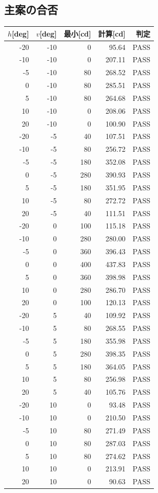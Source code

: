 \documentclass[11pt,a4paper]{article}
\newcommand{\pass}{\textcolor{green!45!black}{PASS}}
\begin{document}
\subsection{主案の合否}
\begin{longtable}{rrrrr}
\toprule
$h$[deg] & $v$[deg] & 最小[cd] & 計算[cd] & 判定 \\
\midrule
-20 & -10 & 0 & 95.64 & \pass{} \\
-10 & -10 & 0 & 207.11 & \pass{} \\
-5 & -10 & 80 & 268.52 & \pass{} \\
0 & -10 & 80 & 285.51 & \pass{} \\
5 & -10 & 80 & 264.68 & \pass{} \\
10 & -10 & 0 & 208.06 & \pass{} \\
20 & -10 & 0 & 100.90 & \pass{} \\
-20 & -5 & 40 & 107.51 & \pass{} \\
-10 & -5 & 80 & 256.72 & \pass{} \\
-5 & -5 & 180 & 352.08 & \pass{} \\
0 & -5 & 280 & 390.93 & \pass{} \\
5 & -5 & 180 & 351.95 & \pass{} \\
10 & -5 & 80 & 272.72 & \pass{} \\
20 & -5 & 40 & 111.51 & \pass{} \\
-20 & 0 & 100 & 115.18 & \pass{} \\
-10 & 0 & 280 & 280.00 & \pass{} \\
-5 & 0 & 360 & 396.43 & \pass{} \\
0 & 0 & 400 & 437.83 & \pass{} \\
5 & 0 & 360 & 398.98 & \pass{} \\
10 & 0 & 280 & 286.70 & \pass{} \\
20 & 0 & 100 & 120.13 & \pass{} \\
-20 & 5 & 40 & 109.92 & \pass{} \\
-10 & 5 & 80 & 268.55 & \pass{} \\
-5 & 5 & 180 & 355.98 & \pass{} \\
0 & 5 & 280 & 398.35 & \pass{} \\
5 & 5 & 180 & 364.05 & \pass{} \\
10 & 5 & 80 & 256.98 & \pass{} \\
20 & 5 & 40 & 105.76 & \pass{} \\
-20 & 10 & 0 & 93.48 & \pass{} \\
-10 & 10 & 0 & 210.50 & \pass{} \\
-5 & 10 & 80 & 271.49 & \pass{} \\
0 & 10 & 80 & 287.03 & \pass{} \\
5 & 10 & 80 & 274.62 & \pass{} \\
10 & 10 & 0 & 213.91 & \pass{} \\
20 & 10 & 0 & 90.63 & \pass{} \\
\bottomrule
\end{longtable}
\end{document}
